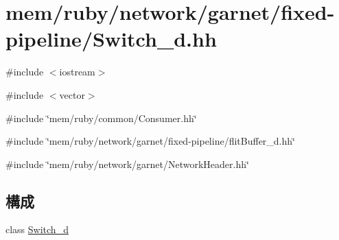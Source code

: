 \hypertarget{Switch__d_8hh}{
\section{mem/ruby/network/garnet/fixed-\/pipeline/Switch\_\-d.hh}
\label{Switch__d_8hh}
}
{\ttfamily \#include $<$iostream$>$}\par
{\ttfamily \#include $<$vector$>$}\par
{\ttfamily \#include \char`\"{}mem/ruby/common/Consumer.hh\char`\"{}}\par
{\ttfamily \#include \char`\"{}mem/ruby/network/garnet/fixed-\/pipeline/flitBuffer\_\-d.hh\char`\"{}}\par
{\ttfamily \#include \char`\"{}mem/ruby/network/garnet/NetworkHeader.hh\char`\"{}}\par
\subsection*{構成}
\begin{DoxyCompactItemize}
\item 
class \hyperlink{classSwitch__d}{Switch\_\-d}
\end{DoxyCompactItemize}
